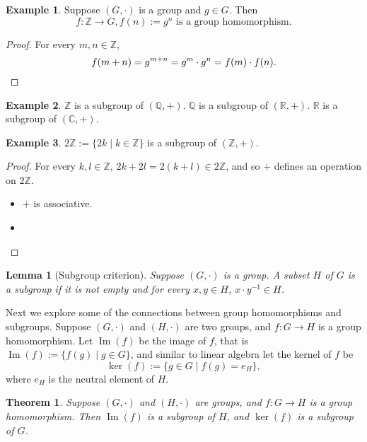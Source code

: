 \documentclass{article}
\theoremstyle{plain}
\newtheorem{lemma}{Lemma}
\newtheorem{theorem}{Theorem}
\theoremstyle{definition}
\newtheorem*{example}{Example}
\newcommand{\FR}{\mathbb{R}}
\newcommand{\FC}{\mathbb{C}}
\newcommand{\FQ}{\mathbb{Q}}
\newcommand{\FZ}{\mathbb{Z}}
\renewcommand{\Im}{\operatorname{Im}}
\begin{document}
\begin{example}
    Suppose $(G,\cdot)$ is a group and $g\in G$. Then
    \[f:\mathbb{Z}\to G,f(n):=g^n\text{ is a group homomorphism.}\]
\end{example}

\begin{proof}
    For every $m,n\in\mathbb{Z}$,
    \[f(m+n)=g^{m+n}=g^m\cdot g^n=f(m)\cdot f(n).\qedhere\]
\end{proof}

\begin{example}
    $\FZ$ is a subgroup of $(\FQ,+)$.
    $\FQ$ is a subgroup of $(\FR,+)$.
    $\FR$ is a subgroup of $(\FC,+)$.
\end{example}

\begin{example}
    $2\FZ:=\{2k\mid k\in\FZ\}$ is a subgroup of $(\FZ,+)$.
\end{example}

\begin{proof}
    For every $k,l\in\FZ$, $2k+2l=2(k+l)\in2\FZ$, and so $+$
    defines an operation on $2\FZ$.
    \begin{itemize}
        \item $+$ is associative.
        \item 
    \end{itemize}
\end{proof}


\begin{lemma}[Subgroup criterion]
    Suppose $(G,\cdot)$ is a group. A subset $H$ of $G$
    is a subgroup if it is not empty and for 
    every $x,y\in H$, $x\cdot y^{-1}\in H$.
\end{lemma}


Next we explore some of the connections between
group homomorphisms and subgroups. Suppose $(G,\cdot)$
and $(H,\cdot)$ are two groups, and $f:G\to H$
is a group homomorphism. Let $\Im(f)$ be the image
of $f$, that is $\Im(f):=\{f(g)\mid g\in G\}$,
and similar to linear algebra let the kernel of $f$ be 
\[\ker(f):=\{g\in G\mid f(g)=e_H\},\]
where $e_H$ is the neutral element of $H$.

\begin{theorem}
    Suppose $(G,\cdot)$ and $(H,\cdot)$ are groups,
    and $f:G\to H$ is a group homomorphism.
    Then $\Im(f)$ is a subgroup of $H$,
    and $\ker(f)$ is a subgroup of $G$.
\end{theorem}
\end{document}
